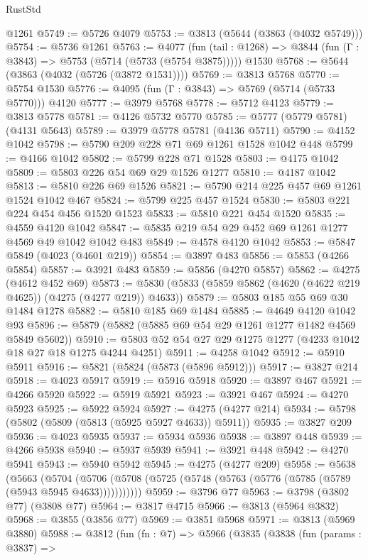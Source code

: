 \begin{lexlean}{RustStd}
\begin{coremodule}
{\begin{coremodule}
{{{{{{{{{{{{{{{{{{{{{{{{{{{{{{{{{{{    @1261
@5749 := @5726 @4079
@5753 := @3813 (@5644 (@3863 (@4032 @5749)))
@5754 := @5736 @1261
@5763 := @4077
    (fun (tail : @1268) => @3844 (fun (Γ : @3843) => @5753 (@5714 (@5733 (@5754 @3875)))))
    @1530
@5768 := @5644 (@3863 (@4032 (@5726 (@3872 @1531))))
@5769 := @3813 @5768
@5770 := @5754 @1530
@5776 := @4095 (fun (Γ : @3843) => @5769 (@5714 (@5733 @5770))) @4120
@5777 := @3979 @5768
@5778 := @5712 @4123
@5779 := @3813 @5778
@5781 := @4126 @5732 @5770
@5785 := @5777 (@5779 @5781) (@4131 @5643)
@5789 := @3979 @5778 @5781 (@4136 @5711)
@5790 := @4152 @1042
@5798 := @5790 @209 @228 @71 @69 @1261 @1528 @1042 @448
@5799 := @4166 @1042
@5802 := @5799 @228 @71 @1528
@5803 := @4175 @1042
@5809 := @5803 @226 @54 @69 @29 @1526 @1277
@5810 := @4187 @1042
@5813 := @5810 @226 @69 @1526
@5821 := @5790 @214 @225 @457 @69 @1261 @1524 @1042 @467
@5824 := @5799 @225 @457 @1524
@5830 := @5803 @221 @224 @454 @456 @1520 @1523
@5833 := @5810 @221 @454 @1520
@5835 := @4559 @4120 @1042
@5847 := @5835 @219 @54 @29 @452 @69 @1261 @1277 @4569 @49 @1042 @1042 @483
@5849 := @4578 @4120 @1042
@5853 := @5847 @5849 (@4023 (@4601 @219))
@5854 := @3897 @483
@5856 := @5853 (@4266 @5854)
@5857 := @3921 @483
@5859 := @5856 (@4270 @5857)
@5862 := @4275 (@4612 @452 @69)
@5873 := @5830 (@5833 (@5859 @5862 (@4620 (@4622 @219 @4625)) (@4275 (@4277 @219)) @4633))
@5879 := @5803 @185 @55 @69 @30 @1484 @1278
@5882 := @5810 @185 @69 @1484
@5885 := @4649 @4120 @1042 @93
@5896 := @5879 (@5882 (@5885 @69 @54 @29 @1261 @1277 @1482 @4569 @5849 @5602))
@5910 := @5803 @52 @54 @27 @29 @1275 @1277 (@4233 @1042 @18 @27 @18 @1275 @4244 @4251)
@5911 := @4258 @1042
@5912 := @5910 @5911
@5916 := @5821 (@5824 (@5873 (@5896 @5912)))
@5917 := @3827 @214
@5918 := @4023 @5917
@5919 := @5916 @5918
@5920 := @3897 @467
@5921 := @4266 @5920
@5922 := @5919 @5921
@5923 := @3921 @467
@5924 := @4270 @5923
@5925 := @5922 @5924
@5927 := @4275 (@4277 @214)
@5934 := @5798 (@5802 (@5809 (@5813 (@5925 @5927 @4633)) @5911))
@5935 := @3827 @209
@5936 := @4023 @5935
@5937 := @5934 @5936
@5938 := @3897 @448
@5939 := @4266 @5938
@5940 := @5937 @5939
@5941 := @3921 @448
@5942 := @4270 @5941
@5943 := @5940 @5942
@5945 := @4275 (@4277 @209)
@5958 := @5638
    (@5663
      (@5704 (@5706 (@5708 (@5725 (@5748 (@5763 (@5776 (@5785 (@5789 (@5943 @5945 @4633)))))))))))
@5959 := @3796 @77
@5963 := @3798 (@3802 @77) (@3808 @77)
@5964 := @3817 @4715
@5966 := @3813 (@5964 @3832)
@5968 := @3855 (@3856 @77)
@5969 := @3851 @5968
@5971 := @3813 (@5969 @3880)
@5988 := @3812
    (fun (fn : @7) =>
    @5966
      (@3835
        (@3838
          (fun (params : @3837) =>
}}}}}}}}}}}}}}}}}}}}}}}}}}}}}}}}}}}
\end{coremodule}}
\end{coremodule}
\end{lexlean}
